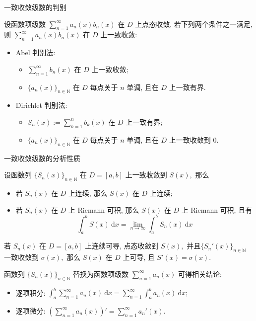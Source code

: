 
\begin{frame}{一致收敛级数的判别}

\begin{thm}[A-D 判别法]
设函数项级数 $\sum\limits_{n=1}^\infty a_n(x)b_n(x)$ 在 $D$ 上点态收敛, 若下列两个条件之一满足, 则 $\sum\limits_{n=1}^\infty a_n(x)b_n(x)$ 在 $D$ 上一致收敛:
\begin{itemize}[<+->]
\item Abel 判别法:
\begin{itemize}
\item $\sum\limits_{n=1}^\infty b_n(x)$ 在 $D$ 上一致收敛;
\item $\{a_n(x)\}_{n\in\mathbb{N}}$ 在 $D$ 每点关于 $n$ 单调, 且在 $D$ 上一致有界.
\end{itemize}
\item Dirichlet 判别法:
\begin{itemize}
\item $S_n(x) := \sum\limits_{k=1}^n b_k(x)$ 在 $D$ 上一致有界;
\item $\{a_n(x)\}_{n\in\mathbb{N}}$ 在 $D$ 每点关于 $n$ 单调, 且在 $D$ 上一致收敛到 $0.$
\end{itemize}
\end{itemize}
\end{thm}

\end{frame}


\begin{frame}{一致收敛级数的分析性质}

设函数列 $\{S_n(x)\}_{n\in\mathbb{N}}$ 在 $D = [a, b]$ 上一致收敛到 $S(x),$ 那么
\pause
\begin{itemize}
\item 若 $S_n(x)$ 在 $D$ 上连续, 那么 $S(x)$ 在 $D$ 上连续;
\pause
\item 若 $S_n(x)$ 在 $D$ 上 Riemann 可积, 那么 $S(x)$ 在 $D$ 上 Riemann 可积, 且有
\[\int_a^b S(x) ~ \mathrm{d} x = \lim\limits_{n\to\infty} \int_a^b S_n(x) ~ \mathrm{d} x\]
\end{itemize}

\pause

若 $S_n(x)$ 在 $D = [a,b]$ 上连续可导, 点态收敛到 $S(x),$ 并且$\{S_n'(x)\}_{n\in\mathbb{N}}$ 一致收敛到 $\sigma(x),$ 那么 $S(x)$ 在 $D$ 上可导, 且 $S'(x) = \sigma(x).$

\pause

函数列 $\{S_n(x)\}_{n\in\mathbb{N}}$ 替换为函数项级数 $\sum\limits_{n=1}^\infty a_n(x)$ 可得相关结论:
\begin{itemize}
\item 逐项积分: $\int_a^b \sum\limits_{n=1}^\infty a_n(x) ~ \mathrm{d} x = \sum\limits_{n=1}^\infty \int_a^b a_n(x) ~ \mathrm{d} x;$
\item 逐项微分: $\left( \sum\limits_{n=1}^\infty a_n(x) \right)' = \sum\limits_{n=1}^\infty a_n'(x).$
\end{itemize}

\end{frame}

